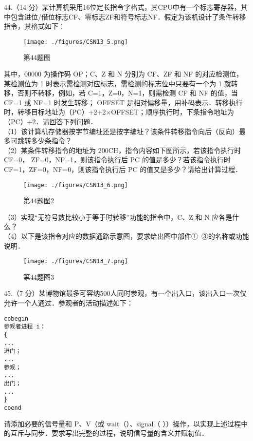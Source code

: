 44.（14 分）某计算机采用16位定长指令字格式，其CPU中有一个标志寄存器，其中包含进位/借位标志CF、零标志ZF和符号标志NF．假定为该机设计了条件转移指令，其格式如下：
\begin{figure}[ht]
\centering
\texttt{[image: ./figures/CSN13\_5.png]}
\caption{第44题图} \label{CSN13_fig5}
\end{figure}
 其中，00000 为操作码 OP；C、Z 和 N 分别为 CF、ZF 和 NF 的对应检测位，某检测位为 1 时表示需检测对应标志，需检测的标志位中只要有一个为 1 就转移，否则不转移，例如，若 C=1，Z=0，N=1，则需检测 CF 和 NF 的值，当 CF=1 或 NF=1 时发生转移； OFFSET 是相对偏移量，用补码表示．转移执行时，转移目标地址为（PC）+2+2×OFFSET；顺序执行时，下条指令地址为（PC）+2．请回答下列问题．  \\
（1）该计算机存储器按字节编址还是按字编址？该条件转移指令向后（反向）最多可跳转多少条指令？ \\
（2）某条件转移指令的地址为 200CH，指令内容如下图所示，若该指令执行时 CF=0， ZF=0，NF=1，则该指令执行后 PC 的值是多少？若该指令执行时 CF=1，ZF=0，NF=0，则该指令执行后 PC 的值又是多少？请给出计算过程． \\
\begin{figure}[ht]
\centering
\texttt{[image: ./figures/CSN13\_6.png]}
\caption{第44题图2} \label{CSN13_fig6}
\end{figure}
（3）实现“无符号数比较小于等于时转移”功能的指令中，C、Z 和 N 应各是什么？  \\
（4）以下是该指令对应的数据通路示意图，要求给出图中部件①~③的名称或功能说明．  \\
\begin{figure}[ht]
\centering
\texttt{[image: ./figures/CSN13\_7.png]}
\caption{第44题图3} \label{CSN13_fig7}
\end{figure}

45.（7 分）某博物馆最多可容纳500人同时参观，有一个出入口，该出入口一次仅允许一个人通过．参观者的活动描述如下：    
\begin{lstlisting}[language=none]
cobegin 
参观者进程 i： 
{ 
...
进门；
...
参观；
...
出门；
...
}
coend 
\end{lstlisting}
请添加必要的信号量和 P、V（或 wait（）、signal（ ））操作，以实现上述过程中的互斥与同步．要求写出完整的过程，说明信号量的含义并赋初值．

